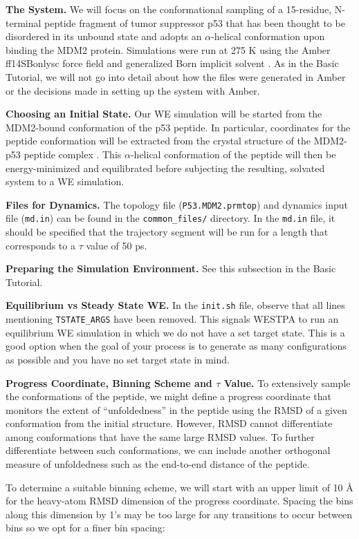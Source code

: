 \documentclass[9pt,tutorial,ASAPversion]{livecoms}
\begin{document}
\textbf{The System.} We will focus on  the conformational sampling of a 15-residue, N-terminal peptide fragment of tumor suppressor p53 that has been thought to be disordered in its unbound state and adopts an $\alpha$-helical conformation upon binding the MDM2 protein. 
Simulations were run at 275 K using the Amber ff14SBonlysc force field \citep{ff} and generalized Born implicit solvent \citep{implicit_solvent}. 
As in the Basic Tutorial, we will not go into detail about how the files were generated in Amber or the decisions made in setting up the system with Amber.

\textbf{Choosing an Initial State.} Our WE simulation will be started from the MDM2-bound conformation of the p53 peptide. 
In particular, coordinates for the peptide conformation will be extracted from the crystal structure of the MDM2-p53 peptide complex \citep{Kussie1996}. 
This $\alpha$-helical conformation of the peptide will then be energy-minimized and equilibrated before subjecting the resulting, solvated system to a WE simulation.

\textbf{Files for Dynamics.} The topology file (\verb|P53.MDM2.prmtop|) and dynamics input file (\verb|md.in|) can be found in the \verb|common_files/| directory. 
In the \verb|md.in| file, it should be specified that the trajectory segment will be run for a length that corresponds to a $\tau$ value of 50 ps.

\textbf{Preparing the Simulation Environment.} See this subsection in the Basic Tutorial.

\textbf{Equilibrium vs Steady State WE.} In the \verb|init.sh| file, observe that all lines mentioning \verb|TSTATE_ARGS| have been removed. 
This signals WESTPA to run an equilibrium WE simulation in which we do not have a set target state. 
This is a good option when the goal of your process is to generate as many configurations as possible and you have no set target state in mind.

\textbf{Progress Coordinate, Binning Scheme and $\tau$ Value.} To extensively sample the conformations of the peptide, we might define a progress coordinate that monitors the extent of “unfoldedness” in the peptide using the RMSD of a given conformation from the initial structure. 
However, RMSD cannot differentiate among conformations that have the same large RMSD values. 
To further differentiate between such conformations, we can include another orthogonal measure of unfoldedness such as the end-to-end distance of the peptide. 

To determine a suitable binning scheme, we will start with an upper limit of 10 \AA{} for the heavy-atom RMSD dimension of the progress coordinate. 
Spacing the bins along this dimension by 1’s may be too large for any transitions to occur between bins so we opt for a finer bin spacing:
\end{document}
